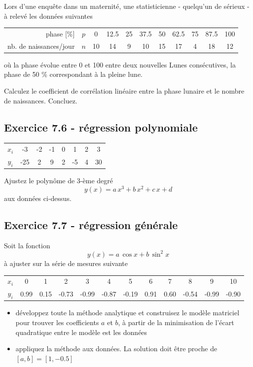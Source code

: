 \documentclass[main.tex]{subfiles}
\begin{document}
Lors d'une enquête dans un maternité, une statisticienne - quelqu'un de sérieux - à relevé les données suivantes
\begin{center}
    \begin{tabular}{r|c|ccccccccc}
        phase [\%]             & $p$ & 0  & 12.5 & 25 & 37.5 & 50 & 62.5 & 75 & 87.5 & 100 \\
        nb. de naissances/jour & $n$ & 10 & 14   & 9  & 10   & 15 & 17   & 4  & 18   & 12
    \end{tabular}
\end{center}
où la phase évolue entre 0 et 100 entre deux nouvelles Lunes consécutives, la phase de 50 \% correspondant à la pleine lune.

Calculez le coefficient de corrélation linéaire entre la phase lunaire et le nombre de naissances. Concluez.

\subsection*{Exercice 7.6 - régression polynomiale}

\begin{center}
    \begin{tabular}{c|ccccccc}
        $x_i$ & -3  & -2 & -1 & 0 & 1  & 2 & 3  \\
        $y_i$ & -25 & 2  & 9  & 2 & -5 & 4 & 30
    \end{tabular}
\end{center}
Ajustez le polynôme de 3-ème degré $$y(x)=a\,x^3+b\,x^2+c\,x+d$$ aux données ci-dessus.

\subsection*{Exercice 7.7 - régression générale}

Soit la fonction
$$
    y(x)=a\,\cos{x}+b\,\sin^{2}{x}
$$
à ajuster sur la série de mesures suivante
\begin{center}
    \begin{tabular}{c|ccccccccccc}
        $x_i$ & 0    & 1    & 2     & 3     & 4     & 5     & 6    & 7    & 8     & 9     & 10    \\
        $y_i$ & 0.99 & 0.15 & -0.73 & -0.99 & -0.87 & -0.19 & 0.91 & 0.60 & -0.54 & -0.99 & -0.90
    \end{tabular}
\end{center}
\begin{itemize}
    \item développez toute la méthode analytique et construisez le modèle matriciel pour trouver les coefficients $a$ et $b$, à partir de la minimisation de l'écart quadratique entre le modèle est les données
    \item appliquez la méthode aux données. La solution doit être proche de $[a,b]=[1,-0.5]$
\end{itemize}
\end{document}
